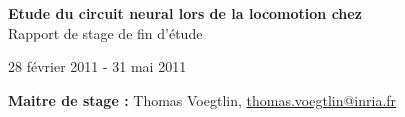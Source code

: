 
\vspace*{\fill}
\begin{center}
   \textbf{ {\Huge Etude du circuit neural lors de la locomotion chez \caeleg{}}}\\[0.5em]{\huge Rapport de stage de fin d'étude}
\end{center}

\begin{center}
  28 février 2011 - 31 mai 2011
\end{center}

\begin{center}
   \textbf{Maitre de stage :} Thomas Voegtlin, \url{thomas.voegtlin@inria.fr}
\end{center}

\vspace*{\fill}

\newpage
